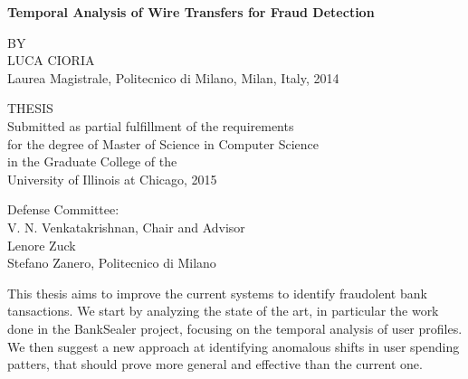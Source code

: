 \documentclass[letterpaper,11pt,oneside,final]{uicthesis}
\newcommand{\thesisTitle}{\textbf{Temporal Analysis of Wire Transfers for Fraud Detection}}
\begin{document}
	\begin{titlepage}
	\vspace*{\fill}
	\begin{spacing}{1.5}
	\begin{center}

		{\Large \thesisTitle}

		\vspace{4.2cm}
    BY\\

    LUCA CIORIA\\
		\vspace{0.2cm}
    Laurea Magistrale, Politecnico di Milano, Milan, Italy, 2014

		\vspace{3.2cm}
    THESIS\\
		\vspace{0.2cm}
    {\linespread{0.6}
    Submitted as partial fulfillment of the requirements\\
    for the degree of Master of Science in Computer Science\\
    in the Graduate College of the\\
  University of Illinois at Chicago, 2015}
		\vspace{0.5cm}
    \begin{flushleft}
      Defense Committee:\\
      \hspace{1cm}V. N. Venkatakrishnan, Chair and Advisor\\
      \hspace{1cm}Lenore Zuck\\
      \hspace{1cm}Stefano Zanero, Politecnico di Milano
    \end{flushleft}

	\end{center}

	\end{spacing}
	\vspace*{\fill}
	\end{titlepage}

	\dedication
		


	\setcounter{tocdepth}{2}
	\tableofcontents
	\listoftables
	\listoffigures

   \summary \label{summary}
   This thesis aims to improve the current systems to identify fraudolent bank tansactions. We start by analyzing the state of the art, in particular the work done in the BankSealer project, focusing on the temporal analysis of user profiles. We then suggest a new approach at identifying anomalous shifts in user spending patters, that should prove more general and effective than the current one.
\end{document}
